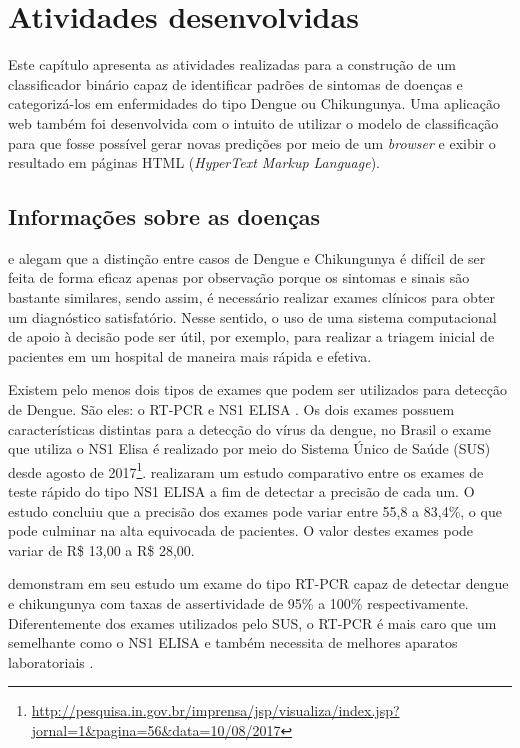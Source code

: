 \chapter{Atividades desenvolvidas}

Este capítulo apresenta as atividades realizadas para a construção de um classificador binário capaz de identificar padrões de sintomas de doenças e categorizá-los  em enfermidades do tipo Dengue ou Chikungunya. Uma aplicação web também foi desenvolvida com o intuito de utilizar o modelo de classificação para que fosse possível gerar novas predições por meio de um \textit{browser} e exibir o resultado em páginas HTML (\textit{HyperText Markup Language}).

\section{Informações sobre as doenças}

 e  alegam que  a distinção entre casos de Dengue e Chikungunya é difícil de ser feita de forma eficaz apenas por observação porque os sintomas e sinais são bastante similares, sendo assim, é necessário realizar exames clínicos para obter um diagnóstico satisfatório. Nesse sentido, o uso de uma sistema computacional de apoio à decisão pode ser útil, por exemplo, para realizar a triagem inicial de pacientes em um hospital de maneira mais rápida e efetiva.

Existem pelo menos dois tipos de exames que podem ser utilizados para detecção de Dengue. São eles: o RT-PCR e NS1 ELISA \cite{verma2016evaluation}. Os dois exames possuem características distintas para a detecção do vírus da dengue, no Brasil o exame que utiliza o NS1 Elisa é realizado por meio do Sistema Único de Saúde (SUS) desde agosto de 2017\footnote{\url{http://pesquisa.in.gov.br/imprensa/jsp/visualiza/index.jsp?jornal=1&pagina=56&data=10/08/2017}}.  realizaram um estudo comparativo entre os exames de teste rápido do tipo NS1 ELISA a fim de detectar a precisão de cada um. O estudo concluiu que a precisão dos exames pode variar entre 55,8 a 83,4\%, o que pode culminar na alta equivocada de pacientes. O valor destes exames pode variar de R\$ 13,00 a R\$ 28,00.

 demonstram em seu estudo um exame do tipo RT-PCR capaz de detectar dengue e chikungunya com taxas de assertividade de 95\% a 100\% respectivamente. Diferentemente dos exames utilizados pelo SUS, o RT-PCR é mais caro que um semelhante como o NS1 ELISA e também necessita de melhores aparatos laboratoriais \cite{verma2016evaluation}.


